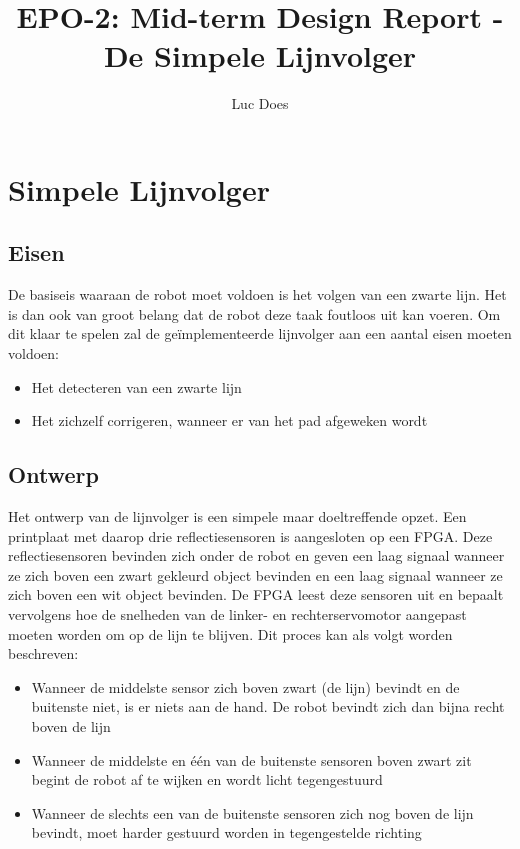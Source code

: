 \documentclass{report}
\title{EPO-2: Mid-term Design Report - De Simpele Lijnvolger}
\author{Luc Does}
\begin{document}
\chapter{Simpele Lijnvolger}
\label{ch:lijnvolger}

\section{Eisen}
De basiseis waaraan de robot moet voldoen is het volgen van een zwarte lijn.
Het is dan ook van groot belang dat de robot deze taak foutloos uit kan voeren.
Om dit klaar te spelen zal de geïmplementeerde lijnvolger aan een aantal eisen moeten voldoen:

\begin{itemize}
\item Het detecteren van een zwarte lijn
\item Het zichzelf corrigeren, wanneer er van het pad afgeweken wordt
\end{itemize}

\section{Ontwerp}
Het ontwerp van de lijnvolger is een simpele maar doeltreffende opzet.
Een printplaat met daarop drie reflectiesensoren is aangesloten op een FPGA.
Deze reflectiesensoren bevinden zich onder de robot en geven een laag signaal wanneer ze zich boven een zwart gekleurd object bevinden en een laag signaal wanneer ze zich boven een wit object bevinden.
De FPGA leest deze sensoren uit en bepaalt vervolgens hoe de snelheden van de linker- en rechterservomotor aangepast moeten worden om op de lijn te blijven.
Dit proces kan als volgt worden beschreven:

\begin{itemize}
	\item Wanneer de middelste sensor zich boven zwart (de lijn) bevindt en de buitenste niet, is er niets aan de hand. De robot bevindt zich dan bijna recht boven de lijn
	\item Wanneer de middelste en één van de buitenste sensoren boven zwart zit begint de robot af te wijken en wordt licht tegengestuurd
	\item Wanneer de slechts een van de buitenste sensoren zich nog boven de lijn bevindt, moet harder gestuurd worden in tegengestelde richting
\end{itemize}
\end{document}

